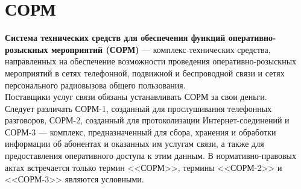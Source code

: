 \section{СОРМ}
\textbf{Система технических средств для обеспечения функций оперативно-розыскных мероприятий (СОРМ)} --- комплекс технических средства, направленных на обеспечение возможности проведения оперативно-розыскных мероприятий в сетях телефонной, подвижной и беспроводной связи и сетях персонального радиовызова общего пользования.\\
Поставщики услуг связи обязаны устанавливать СОРМ за свои деньги.\\
Следует различать СОРМ-1, созданный для прослушивания телефонных разговоров, СОРМ-2, созданный для протоколизации Интернет-соединений\cite{sorm_12} и СОРМ-3 --- комплекс, предназначенный для сбора, хранения и обработки информации об абонентах и оказанных им услугам связи, а также для предоставления оперативного доступа к этим данным\cite{sorm_3}. В нормативно-правовых актах встречается только термин <<СОРМ>>, термины <<СОРМ-2>> и <<СОРМ-3>> являются условными\cite{sorm_name}.
